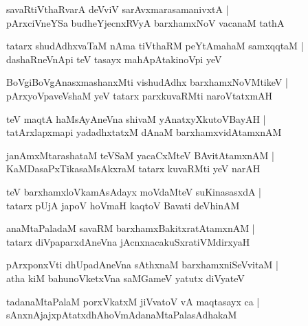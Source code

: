 \begin{shloka}
savaRtiVthaRvarA deVviV sarAvxmarasamanivxtA |\\
pArxciVneYSa budheYjecnxRVyA barxhamxNoV vacanaM tathA
\end{shloka}

\begin{shloka}
tatarx shudAdhxvaTaM nAma tiVthaRM peYtAmahaM samxqqtaM |\\
dashaRneVnApi teV tasayx mahApAtakinoVpi yeV 
\end{shloka}

\begin{shloka}
BoVgiBoVgAnasxmashanxMti vishudAdhx barxhamxNoVMtikeV |\\
pArxyoVpaveVshaM yeV tatarx parxkuvaRMti naroVtatxmAH
\end{shloka}

\begin{shloka}
teV maqtA haMsAyAneVna shivaM yAnatxyXkutoVBayAH |\\
tatArxlapxmapi yadadhxtatxM dAnaM barxhamxvidAtamxnAM
\end{shloka}

\begin{shloka}
janAmxMtarashataM teVSaM yacaCxMteV BAvitAtamxnAM |\\
KaMDasaPxTikasaMsAkxraM tatarx kuvaRMti yeV narAH
\end{shloka}

\begin{shloka}
teV barxhamxloVkamAsAdayx moVdaMteV suKinasasxdA |\\
tatarx pUjA japoV hoVmaH kaqtoV Bavati deVhinAM 
\end{shloka}

\begin{shloka}
anaMtaPaladaM savaRM barxhamxBakitxratAtamxnAM |\\
tatarx diVpaparxdAneVna jAcnxnacakuSxratiVMdirxyaH
\end{shloka}

\begin{shloka}
pArxponxVti dhUpadAneVna sAthxnaM barxhamxniSeVvitaM |\\
atha kiM bahunoVketxVna saMGameV yatutx diVyateV 
\end{shloka}

\begin{shloka}
tadanaMtaPalaM porxVkatxM jiVvatoV vA maqtasayx ca |\\
sAnxnAjajxpAtatxdhAhoVmAdanaMtaPalasAdhakaM
\end{shloka}

